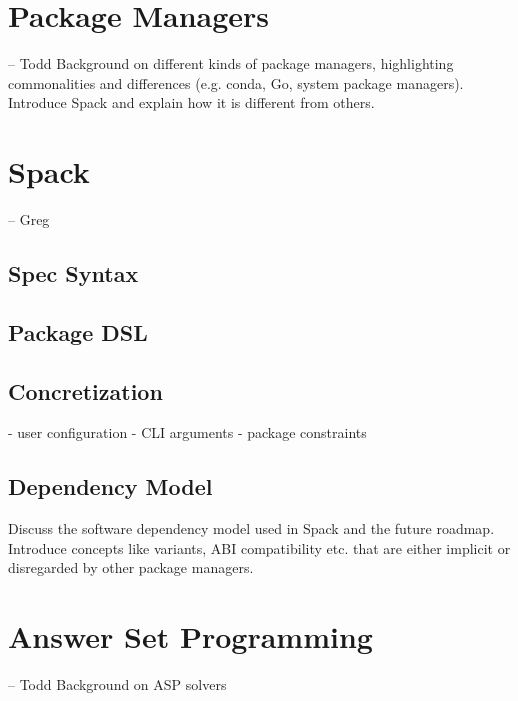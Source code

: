 \section{Package Managers}
-- Todd
Background on different kinds of package managers, highlighting commonalities and differences (e.g. conda, Go, system package managers). Introduce Spack and explain how it is different from others.

\section{Spack}
-- Greg
\subsection{Spec Syntax}

\subsection{Package DSL}

\subsection{Concretization}
- user configuration
- CLI arguments
- package constraints

\subsection{Dependency Model}
Discuss the software dependency model used in Spack and the future roadmap. Introduce concepts like variants, ABI compatibility etc. that are either implicit or disregarded by other package managers.


\section{Answer Set Programming}
-- Todd
Background on ASP solvers

